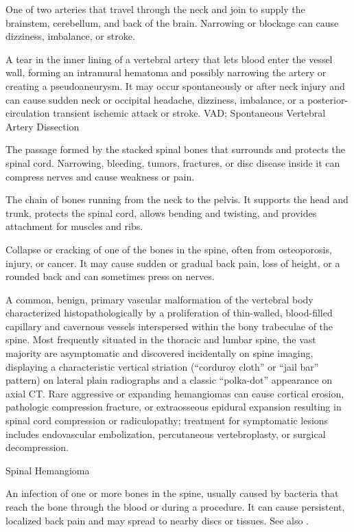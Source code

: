  One of two arteries that travel through the neck and join to supply the brainstem, cerebellum, and back of the brain. Narrowing or blockage can cause dizziness, imbalance, or stroke.

 A tear in the inner lining of a vertebral artery that lets blood enter the vessel wall, forming an intramural hematoma and possibly narrowing the artery or creating a pseudoaneurysm. It may occur spontaneously or after neck injury and can cause sudden neck or occipital headache, dizziness, imbalance, or a posterior-circulation transient ischemic attack or stroke.
\synonyms
VAD; Spontaneous Vertebral Artery Dissection

 The passage formed by the stacked spinal bones that surrounds and protects the spinal cord. Narrowing, bleeding, tumors, fractures, or disc disease inside it can compress nerves and cause weakness or pain.

 The chain of bones running from the neck to the pelvis. It supports the head and trunk, protects the spinal cord, allows bending and twisting, and provides attachment for muscles and ribs.

 Collapse or cracking of one of the bones in the spine, often from osteoporosis, injury, or cancer. It may cause sudden or gradual back pain, loss of height, or a rounded back and can sometimes press on nerves.

 A common, benign, primary vascular malformation of the vertebral body characterized histopathologically by a proliferation of thin-walled, blood-filled capillary and cavernous vessels interspersed within the bony trabeculae of the spine. Most frequently situated in the thoracic and lumbar spine, the vast majority are asymptomatic and discovered incidentally on spine imaging, displaying a characteristic vertical striation (``corduroy cloth'' or ``jail bar'' pattern) on lateral plain radiographs and a classic ``polka-dot'' appearance on axial CT. Rare aggressive or expanding hemangiomas can cause cortical erosion, pathologic compression fracture, or extraosseous epidural expansion resulting in spinal cord compression or radiculopathy; treatment for symptomatic lesions includes endovascular embolization, percutaneous vertebroplasty, or surgical decompression.

\synonyms
Spinal Hemangioma

 An infection of one or more bones in
  the spine, usually caused by bacteria that reach the bone through the
  blood or during a procedure. It can cause persistent, localized back
  pain and may spread to nearby discs or tissues. See also
  .

